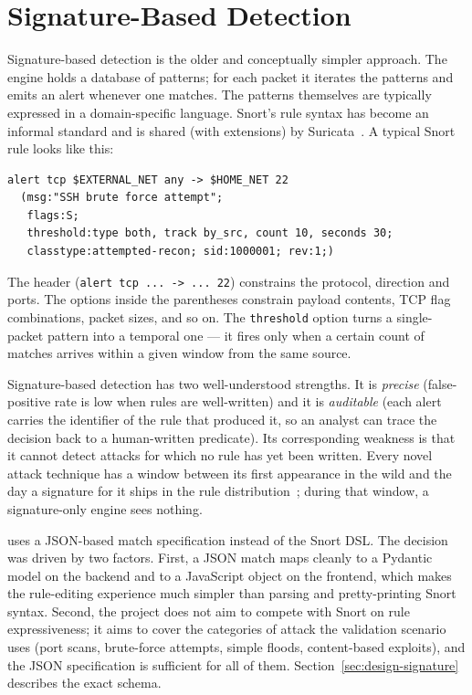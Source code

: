 \section{Signature-Based Detection}
\label{sec:bg-signature}

Signature-based detection is the older and conceptually simpler
approach. The engine holds a database of patterns; for each packet it
iterates the patterns and emits an alert whenever one matches. The
patterns themselves are typically expressed in a domain-specific
language. Snort's rule syntax has become an informal standard and is
shared (with extensions) by Suricata~\cite{suricata}. A typical Snort
rule looks like this:

\begin{verbatim}
alert tcp $EXTERNAL_NET any -> $HOME_NET 22
  (msg:"SSH brute force attempt";
   flags:S;
   threshold:type both, track by_src, count 10, seconds 30;
   classtype:attempted-recon; sid:1000001; rev:1;)
\end{verbatim}

The header (\verb|alert tcp ... -> ... 22|) constrains the protocol,
direction and ports. The options inside the parentheses constrain
payload contents, TCP flag combinations, packet sizes, and so on. The
\verb|threshold| option turns a single-packet pattern into a temporal
one --- it fires only when a certain count of matches arrives within a
given window from the same source.

Signature-based detection has two well-understood strengths. It is
\emph{precise} (false-positive rate is low when rules are well-written)
and it is \emph{auditable} (each alert carries the identifier of the
rule that produced it, so an analyst can trace the decision back to a
human-written predicate). Its corresponding weakness is that it cannot
detect attacks for which no rule has yet been written. Every novel
attack technique has a window between its first appearance in the wild
and the day a signature for it ships in the rule
distribution~\cite{garcia2009anomaly}; during that window, a
signature-only engine sees nothing.

\nidsname{} uses a JSON-based match specification instead of the
Snort DSL. The decision was driven by two factors. First, a JSON match
maps cleanly to a Pydantic model on the backend and to a JavaScript
object on the frontend, which makes the rule-editing experience much
simpler than parsing and pretty-printing Snort syntax. Second, the
project does not aim to compete with Snort on rule expressiveness; it
aims to cover the categories of attack the validation scenario uses
(port scans, brute-force attempts, simple floods, content-based
exploits), and the JSON specification is sufficient for all of them.
Section~\ref{sec:design-signature} describes the exact schema.

